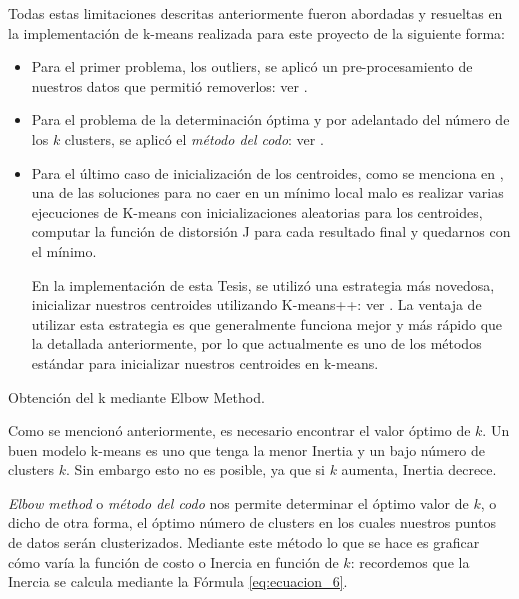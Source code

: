 \documentclass[12pt,a4paper]{article}
\makeatletter
\renewcommand\paragraph{\@startsection{paragraph}{4}{\z@}
            {-2.5ex\@plus -1ex \@minus -.25ex}
            {1.25ex \@plus .25ex}
            {\normalfont\normalsize\bfseries}}
\makeatother
\begin{document}
\begin{sloppypar}
\begin{enumerate}
\end{enumerate}

Todas estas limitaciones descritas anteriormente fueron abordadas y resueltas en la implementación de k-means realizada para este proyecto de la siguiente forma:

\begin{itemize}

\item Para el primer problema, los outliers, se aplicó un pre-procesamiento de nuestros datos que permitió removerlos: ver \textit{}.

\item Para el problema de la determinación óptima y por adelantado del número de los $k$ clusters, se aplicó el \textit{método del codo}: ver \textit{}.

\item Para el último caso de inicialización de los centroides, como se menciona en \textit{}, una de las soluciones para no caer en un mínimo local malo es realizar varias ejecuciones de K-means con inicializaciones aleatorias para los centroides, computar la función de distorsión J para cada resultado final y quedarnos con el mínimo. 

En la implementación de esta Tesis, se utilizó una estrategia más novedosa, inicializar nuestros centroides utilizando K-means++: ver \textit{}. La ventaja de utilizar esta estrategia es que generalmente funciona mejor y más rápido que la detallada anteriormente, por lo que actualmente es uno de los métodos estándar para inicializar nuestros centroides en k-means. \cite{K_means_plus_plus}
\end{itemize}

\cleardoublepage
\paragraph{Obtención del k mediante Elbow Method.}\label{Elbow_Met}

Como se mencionó anteriormente, es necesario encontrar el valor óptimo de $k$. Un buen modelo k-means es uno que tenga la menor Inertia y un bajo número de clusters $k$. Sin embargo esto no es posible, ya que si $k$ aumenta, Inertia decrece.

\textit{Elbow method} o \textit{método del codo} nos permite determinar el óptimo valor de $k$, o dicho de otra forma, el óptimo número de clusters en los cuales nuestros puntos de datos serán clusterizados. Mediante este método lo que se hace es graficar cómo varía la función de costo o Inercia en función de $k$: recordemos que la Inercia se calcula mediante la Fórmula \ref{eq:ecuacion_6}. 


\end{sloppypar}
\end{document}
